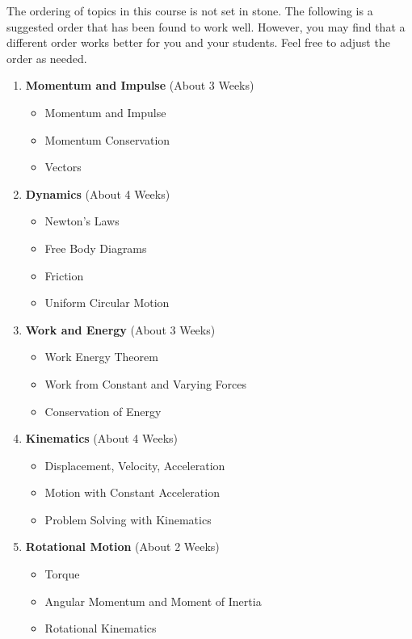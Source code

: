 The ordering of topics in this course is not set in stone.  The following is a suggested order
that has been found to work well.  However, you may find that a different order works better
for you and your students.  Feel free to adjust the order as needed. \\ 

\begin{enumerate}
    \item \textbf{Momentum and Impulse} (About 3 Weeks)
        \begin{itemize}
            \item Momentum and Impulse
            \item Momentum Conservation
            \item Vectors
        \end{itemize}
    \item \textbf{Dynamics} (About 4 Weeks)
        \begin{itemize}
            \item Newton's Laws
            \item Free Body Diagrams
            \item Friction 
            \item Uniform Circular Motion
        \end{itemize}
    \item \textbf{Work and Energy} (About 3 Weeks)
        \begin{itemize}
            \item Work Energy Theorem
            \item Work from Constant and Varying Forces
            \item Conservation of Energy
        \end{itemize}
    \item \textbf{Kinematics} (About 4 Weeks)
        \begin{itemize}
            \item Displacement, Velocity, Acceleration
            \item Motion with Constant Acceleration
            \item Problem Solving with Kinematics
        \end{itemize}
    \item \textbf{Rotational Motion} (About 2 Weeks)
        \begin{itemize}
            \item Torque
            \item Angular Momentum and Moment of Inertia
            \item Rotational Kinematics
        \end{itemize}
\end{enumerate}

